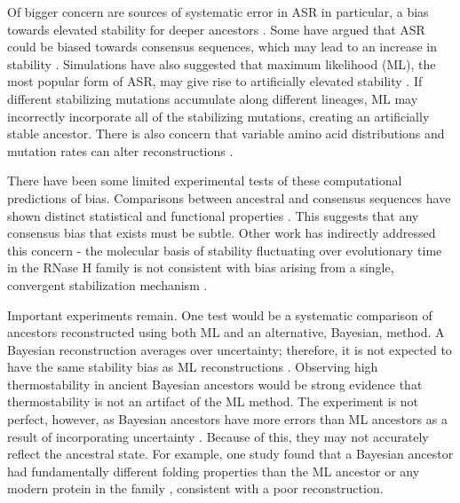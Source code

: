 Of bigger concern are sources of systematic error in ASR \textemdash{}
in particular, a bias towards elevated stability for deeper ancestors
\cite{williams_assessing_2006,bershtein_intense_2008,pollock_amino_2012,goldstein_nonadaptive_2015}.
Some have argued that ASR could be biased towards consensus sequences,
which may lead to an increase in stability \cite{bershtein_intense_2008,gaschen_diversity_2002,kothe_ancestral_2006}.
Simulations have also suggested that maximum likelihood (ML), the
most popular form of ASR, may give rise to artificially elevated stability
\cite{williams_assessing_2006}. If different stabilizing mutations
accumulate along different lineages, ML may incorrectly incorporate
all of the stabilizing mutations, creating an artificially stable
ancestor. There is also concern that variable amino acid distributions
and mutation rates can alter reconstructions \cite{pollock_amino_2012,goldstein_nonadaptive_2015}.

There have been some limited experimental tests of these computational
predictions of bias. Comparisons between ancestral and consensus sequences
have shown distinct statistical and functional properties \cite{akanuma_experimental_2013,akanuma_phylogeny-based_2011,cole_utilizing_2011,risso_phenotypic_2014}.
This suggests that any consensus bias that exists must be subtle.
Other work has indirectly addressed this concern - the molecular basis
of stability fluctuating over evolutionary time in the RNase H family
is not consistent with bias arising from a single, convergent stabilization
mechanism \cite{hart_thermodynamic_2014,williams_assessing_2006}.

Important experiments remain. One test would be a systematic comparison
of ancestors reconstructed using both ML and an alternative, Bayesian,
method. A Bayesian reconstruction averages over uncertainty; therefore,
it is not expected to have the same stability bias as ML reconstructions
\cite{williams_assessing_2006}. Observing high thermostability in
ancient Bayesian ancestors would be strong evidence that thermostability
is not an artifact of the ML method. The experiment is not perfect,
however, as Bayesian ancestors have more errors than ML ancestors
as a result of incorporating uncertainty \cite{hanson-smith_robustness_2010}.
Because of this, they may not accurately reflect the ancestral state.
For example, one study found that a Bayesian ancestor had fundamentally
different folding properties than the ML ancestor or any modern protein
in the family \cite{hobbs_origin_2012}, consistent with a poor reconstruction.

